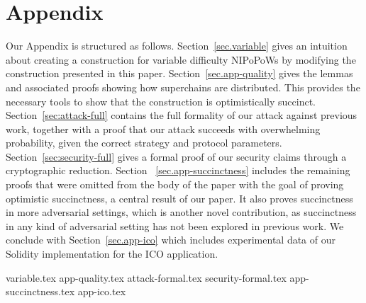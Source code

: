 \appendix
\section*{Appendix}

Our Appendix is structured as follows.
Section~\ref{sec.variable} gives an intuition about creating a construction for
variable difficulty NIPoPoWs by modifying the construction presented in this
paper.
Section~\ref{sec.app-quality} gives the lemmas and associated proofs showing how
superchains are distributed. This provides the necessary tools to show that the
construction is optimistically succinct. Section~\ref{sec:attack-full} contains
the full formality of our attack against previous work, together with a proof
that our attack succeeds with overwhelming probability, given the correct
strategy and protocol parameters. Section~\ref{sec:security-full} gives a formal
proof of our security claims through a cryptographic reduction. Section~
\ref{sec.app-succinctness} includes the remaining proofs that were omitted from
the body of the paper with the goal of proving optimistic succinctness, a
central result of our paper. It also proves succinctness in more adversarial
settings, which is another novel contribution, as succinctness in any kind of
adversarial setting has not been explored in previous work. We conclude with
Section~\ref{sec.app-ico} which includes experimental data of our Solidity
implementation for the ICO application.

{variable.tex}
{app-quality.tex}
{attack-formal.tex}
{security-formal.tex}
{app-succinctness.tex}
{app-ico.tex}
